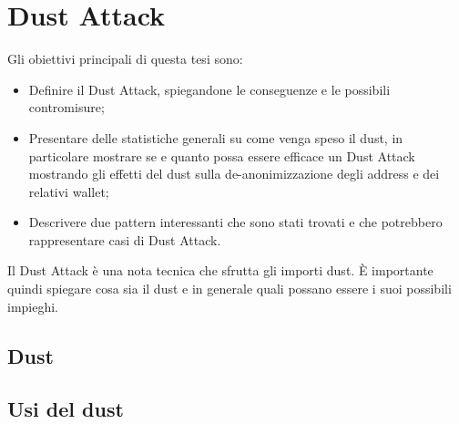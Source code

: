 \chapter{Dust Attack}
Gli obiettivi principali di questa tesi sono:
\begin{itemize}
\item Definire il Dust Attack, spiegandone le conseguenze e le possibili contromisure;
    \item Presentare delle statistiche generali su come venga speso il dust, in particolare mostrare se e quanto possa essere efficace un Dust Attack mostrando gli effetti del dust sulla de-anonimizzazione degli address e dei relativi wallet;
    \item Descrivere due pattern interessanti che sono stati trovati e che potrebbero rappresentare casi di Dust Attack.
\end{itemize}
Il Dust Attack è una nota tecnica che sfrutta gli importi dust. È importante quindi spiegare cosa sia il dust e in generale quali possano essere i suoi possibili impieghi.
\section{Dust}
\section{Usi del dust}
